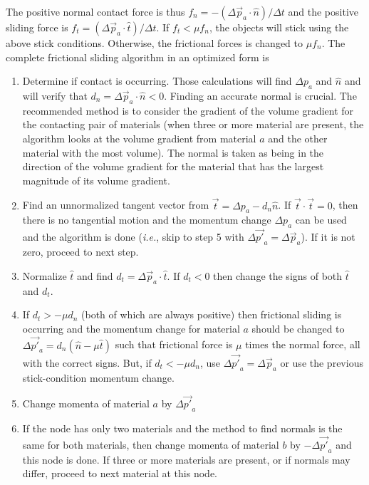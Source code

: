 \documentclass[11pt]{article}
\begin{document}
The positive normal contact force is thus $f_n = -(\Delta \vec p_a\cdot \hat n)/\Delta t$ and the positive sliding force is $f_t = (\Delta \vec p_a\cdot \hat t)/\Delta t$. If $f_t<\mu f_n$, the objects will stick using the above stick conditions. Otherwise, the frictional forces is changed to $\mu f_n$. The complete frictional sliding algorithm in an optimized form is
\begin{enumerate}

\item Determine if contact is occurring. Those calculations will find $\Delta p_a$ and $\hat n$ and will verify that $d_n = \Delta \vec p_a\cdot \hat n<0$. Finding an accurate normal is crucial. The recommended method is to consider the gradient of the volume gradient for the contacting pair of materials (when three or more material are present, the algorithm looks at the volume gradient from material $a$ and the other material with the most volume). The normal is taken as being in the direction of the volume gradient for the material that has the largest magnitude of its volume gradient.

\item Find an unnormalized tangent vector from $\vec t = \Delta p_a - d_n\hat n$. If $\vec t\cdot\vec t=0$, then there is no tangential motion and the momentum change $\Delta p_a$ can be used and the algorithm is done ({\em i.e.}, skip to step 5 with $\Delta \vec {p'}_a =\Delta \vec p_a$). If it is not zero, proceed to next step.

\item Normalize $\hat t$ and find $d_t = \Delta \vec p_a\cdot \hat t$. If $d_t<0$ then change the signs of both $\hat t$ and $d_t$.

\item If $d_t>-\mu d_n$ (both of which are always positive) then frictional sliding is occurring and the momentum change for material $a$ should be changed to $\Delta \vec {p'}_a= d_n(\hat n - \mu\hat t)$ such that frictional force is $\mu$ times the normal force, all with the correct signs. But, if $d_t<-\mu d_n$, use $\Delta \vec {p'}_a =\Delta \vec p_a$ or use the previous stick-condition momentum change.

\item Change momenta of material $a$ by $\Delta\vec {p'}_a$

\item If the node has only two materials and the method to find normals is the same for both materials, then change momenta of material $b$ by $-\Delta\vec {p'}_a$ and this node is done. If three or more materials are present, or if normals may differ, proceed to next material at this node.

\end {enumerate}
\end{document}
